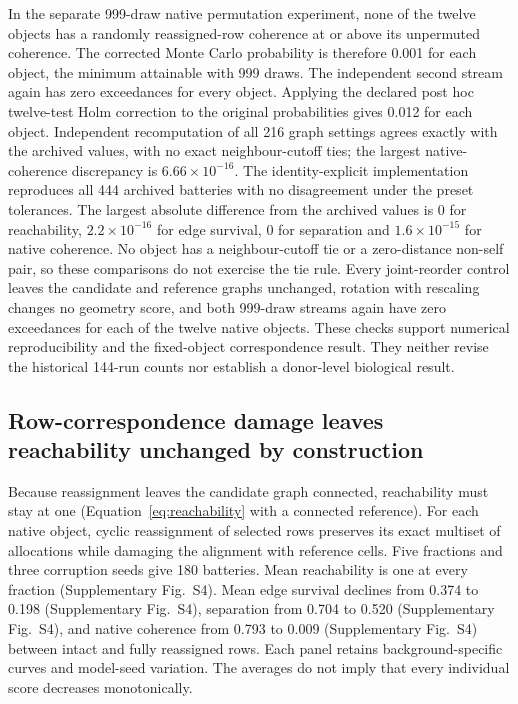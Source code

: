 \documentclass[11pt]{article}
\begin{document}
{ { { { In the separate 999-draw native permutation experiment, none of the twelve objects has a randomly reassigned-row coherence at or above its unpermuted coherence. The corrected Monte Carlo probability is therefore 0.001 for each object, the minimum attainable with 999 draws. The independent second stream again has zero exceedances for every object. Applying the declared post hoc twelve-test Holm correction to the original probabilities gives 0.012 for each object. Independent recomputation of all 216 graph settings agrees exactly with the archived values, with no exact neighbour-cutoff ties; the largest native-coherence discrepancy is $6.66\times10^{-16}$. The identity-explicit implementation reproduces all 444 archived batteries with no disagreement under the preset tolerances. The largest absolute difference from the archived values is 0 for reachability, $2.2\times10^{-16}$ for edge survival, 0 for separation and $1.6\times10^{-15}$ for native coherence. No object has a neighbour-cutoff tie or a zero-distance non-self pair, so these comparisons do not exercise the tie rule. Every joint-reorder control leaves the candidate and reference graphs unchanged, rotation with rescaling changes no geometry score, and both 999-draw streams again have zero exceedances for each of the twelve native objects. These checks support numerical reproducibility and the fixed-object correspondence result. They neither revise the historical 144-run counts nor establish a donor-level biological result.\par}\par}\par}\par}

\subsection{Row-correspondence damage leaves reachability unchanged by construction}

Because reassignment leaves the candidate graph connected, reachability must stay at one (Equation~\ref{eq:reachability} with a connected reference). For each native object, cyclic reassignment of selected rows preserves its exact multiset of allocations while damaging the alignment with reference cells. Five fractions and three corruption seeds give 180 batteries. Mean reachability is one at every fraction (Supplementary Fig.~S4). Mean edge survival declines from 0.374 to 0.198 (Supplementary Fig.~S4), separation from 0.704 to 0.520 (Supplementary Fig.~S4), and native coherence from 0.793 to 0.009 (Supplementary Fig.~S4) between intact and fully reassigned rows. Each panel retains background-specific curves and model-seed variation. The averages do not imply that every individual score decreases monotonically.
\end{document}
